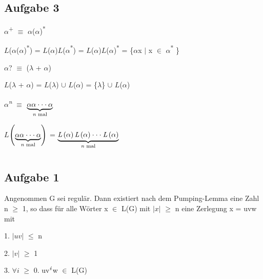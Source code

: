 \documentclass{report}
\begin{document}
\newpage
\section{Aufgabe 3}

\centerline{$\alpha$\textsuperscript{+} $\equiv$ $\alpha$($\alpha$)\textsuperscript{*}}
\centerline{$\textit{L}$($\alpha$($\alpha$)\textsuperscript{*}) = $\textit{L}$($\alpha$)$\textit{L}$($\alpha$\textsuperscript{*}) = $\textit{L}$($\alpha$)$\textit{L}$($\alpha$)\textsuperscript{*} = \{$\alpha$x $\vert$ x $\in$ $\alpha$\textsuperscript{*} \}}
\vspace{0.5cm}

\centerline{$\alpha$? $\equiv$ ($\lambda$ + $\alpha$)}
\centerline{$\textit{L}$($\lambda$ + $\alpha$) = $\textit{L}$($\lambda$) $\cup$ $\textit{L}$($\alpha$) = \{$\lambda$\} $\cup$ $\textit{L}$($\alpha$)}
\vspace{0.5cm}

\centerline{$\alpha$\textsuperscript{\textit{n}} $\equiv$ $\underbrace{\alpha \alpha \cdot \cdot \cdot \alpha}_{\text{\textit{n} mal} }$}
\centerline{$\textit{L}$$\left(\underbrace{\alpha \alpha \cdot \cdot \cdot \alpha}_{\text{\textit{n} mal} }\right)$ = $\underbrace{\textit{L}\left(\alpha\right) \textit{L}\left(\alpha\right) \cdot \cdot \cdot \textit{L}\left(\alpha\right)}_{\text{\textit{n} mal} }$}

\chapter{}
\section{Aufgabe 1}
Angenommen G sei regulär. Dann existiert nach dem Pumping-Lemma eine Zahl n $\geq$ 1, so dass für alle Wörter x $\in$ L(G) mit
$\left\lvert x\right\rvert$ $\geq$ n eine Zerlegung x = uvw mit

1. $\left\lvert uv\right\rvert$ $\leq$ n

2. $\left\lvert v\right\rvert$ $\geq$ 1

3. $\forall\textit{i}$ $\geq$ 0. uv$\textsuperscript{\textit{i}}$w $\in$ L(G)
\end{document}
